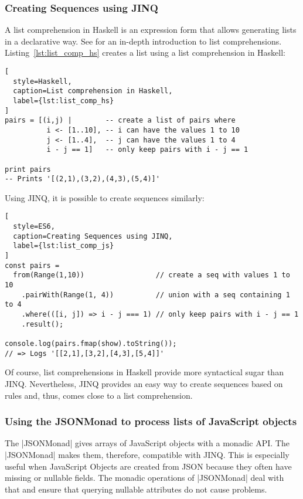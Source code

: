 \subsubsection{Creating Sequences using JINQ} %
\label{subsub:Creating Sequences using JINQ}
A list comprehension in Haskell is an expression form that allows generating
lists in a declarative way. See \cite[Ch. 5]{hutton_pih_2016} for an
in-depth introduction to list comprehensions. \\
Listing~\ref{lst:list_comp_hs} creates a list using a list comprehension in
Haskell:

\begin{lstlisting}[
  style=Haskell,
  caption=List comprehension in Haskell,
  label={lst:list_comp_hs}
]
pairs = [(i,j) |        -- create a list of pairs where
          i <- [1..10], -- i can have the values 1 to 10
          j <- [1..4],  -- j can have the values 1 to 4
          i - j == 1]   -- only keep pairs with i - j == 1

print pairs
-- Prints '[(2,1),(3,2),(4,3),(5,4)]'
\end{lstlisting}

Using JINQ, it is possible to create sequences similarly:
\begin{lstlisting}[
  style=ES6,
  caption=Creating Sequences using JINQ,
  label={lst:list_comp_js}
]
const pairs =
  from(Range(1,10))                 // create a seq with values 1 to 10
    .pairWith(Range(1, 4))          // union with a seq containing 1 to 4
    .where(([i, j]) => i - j === 1) // only keep pairs with i - j == 1
    .result();

console.log(pairs.fmap(show).toString());
// => Logs '[[2,1],[3,2],[4,3],[5,4]]'
\end{lstlisting}

Of course, list comprehensions in Haskell provide more syntactical sugar than
JINQ. Nevertheless, JINQ provides an easy way to create sequences based on
rules and, thus, comes close to a list comprehension.

\subsubsection{Using the JSONMonad to process lists of JavaScript objects} %
\label{subsub:Using the JSONMonad to process lists of JavaScript objects}
The |JSONMonad| gives arrays of JavaScript objects with a monadic API. The
|JSONMonad| makes them, therefore, compatible with JINQ. This is especially
useful when JavaScript Objects are created from JSON because they often have
missing or nullable fields. The monadic operations of |JSONMonad| deal with
that and ensure that querying nullable attributes do not cause problems.

